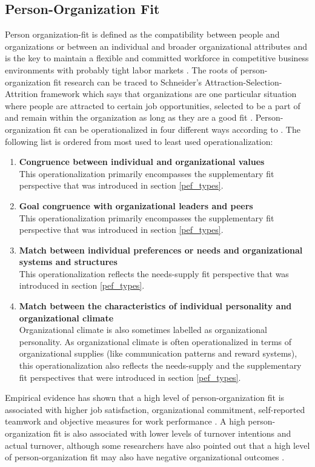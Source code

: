 \documentclass[draft,final]{thesisclass} %
\begin{document}
\subsection{Person-Organization Fit}
Person organization-fit is defined as the compatibility between people and organizations or between an individual and broader organizational attributes and is the key to maintain a flexible and committed workforce in competitive business environments with probably tight labor markets \cite[182]{po_and_pj_fit_literature_review}.
The roots of person-organization fit research can be traced to Schneider's Attraction-Selection-Attrition framework which says that organizations are one particular situation where people are attracted to certain job opportunities, selected to be a part of and remain within the organization as long as they are a good fit \cite[182]{po_and_pj_fit_literature_review}.
Person-organization fit can be operationalized in four different ways according to \cite[182]{po_and_pj_fit_literature_review}. The following list is ordered from most used to least used operationalization:
\begin{enumerate}
    \item \textbf{Congruence between individual and organizational values}\\
    This operationalization primarily encompasses the supplementary fit perspective that was introduced in section \ref{pef_types}.
    \item \textbf{Goal congruence with organizational leaders and peers}\\
    This operationalization primarily encompasses the supplementary fit perspective that was introduced in section \ref{pef_types}.
    \item \textbf{Match between individual preferences or needs and organizational systems and structures}\\
    This operationalization reflects the needs-supply fit perspective that was introduced in section \ref{pef_types}.
    \item \textbf{Match between the characteristics of individual personality and organizational climate}\\
    Organizational climate is also sometimes labelled as organizational personality.
    As organizational climate is often operationalized in terms of organizational supplies (like communication patterns and reward systems), this operationalization also reflects the needs-supply and the supplementary fit perspectives that were introduced in section \ref{pef_types}.
\end{enumerate}
Empirical evidence has shown that a high level of person-organization fit is associated with higher job satisfaction, organizational commitment, self-reported teamwork and objective measures for work performance \cite[183]{po_and_pj_fit_literature_review}.
A high person-organization fit is also associated with lower levels of turnover intentions and actual turnover, although some researchers have also pointed out that a high level of person-organization fit may also have negative organizational outcomes \cite[183]{po_and_pj_fit_literature_review}.
\end{document}
